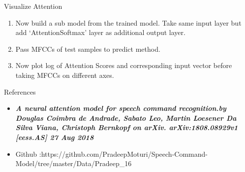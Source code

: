 \documentclass[11pt]{beamer}
\begin{document}
\begin{frame}
{Visualize Attention}
\begin{enumerate}
    \item Now build a sub model from the trained model. Take same input layer but add ‘AttentionSoftmax’ layer as additional output layer.
    \item Pass MFCCs of test samples to predict method.
    \item Now plot log of Attention Scores and corresponding input vector before taking MFCCs on different axes.
    \end{enumerate}
\end{frame}
\begin{frame}
{References}
\begin{itemize}
 \item \textit{\textbf{A neural attention model for speech command
recognition.by Douglas Coimbra de Andrade, Sabato Leo, Martin Loesener Da Silva Viana, Christoph Bernkopf on arXiv.
arXiv:1808.08929v1 [eess.AS] 27 Aug 2018}}

 \item Github :https://github.com/PradeepMoturi/Speech-Command-Model/tree/master/Data/Pradeep_16
\end{itemize}
\end{frame}
\end{document}
